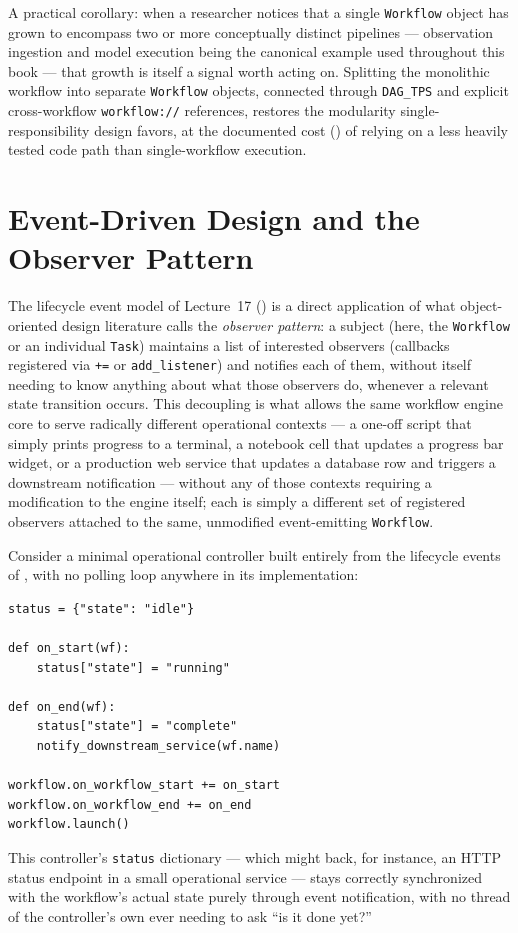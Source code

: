 \begin{practicebox}
A practical corollary: when a researcher notices that a single
\texttt{Workflow} object has grown to encompass two or more conceptually
distinct pipelines --- observation ingestion and model execution being the
canonical example used throughout this book --- that growth is itself a
signal worth acting on. Splitting the monolithic workflow into separate
\texttt{Workflow} objects, connected through \texttt{DAG\_TPS} and explicit
cross-workflow \texttt{workflow://} references, restores the modularity
single-responsibility design favors, at the documented cost
() of relying on a less heavily tested code path than
single-workflow execution.
\end{practicebox}

\section{Event-Driven Design and the Observer Pattern}

The lifecycle event model of Lecture~17 () is a
direct application of what object-oriented design literature calls the
\emph{observer pattern}: a subject (here, the \texttt{Workflow} or an
individual \texttt{Task}) maintains a list of interested observers
(callbacks registered via \texttt{+=} or \texttt{add\_listener}) and
notifies each of them, without itself needing to know anything about what
those observers do, whenever a relevant state transition occurs. This
decoupling is what allows the same workflow engine core to serve radically
different operational contexts --- a one-off script that simply prints
progress to a terminal, a notebook cell that updates a progress bar widget,
or a production web service that updates a database row and triggers a
downstream notification --- without any of those contexts requiring a
modification to the engine itself; each is simply a different set of
registered observers attached to the same, unmodified event-emitting
\texttt{Workflow}.

\begin{example}
Consider a minimal operational controller built entirely from the lifecycle
events of , with no polling loop anywhere in its
implementation:
\begin{lstlisting}
status = {"state": "idle"}

def on_start(wf):
    status["state"] = "running"

def on_end(wf):
    status["state"] = "complete"
    notify_downstream_service(wf.name)

workflow.on_workflow_start += on_start
workflow.on_workflow_end += on_end
workflow.launch()
\end{lstlisting}
This controller's \texttt{status} dictionary --- which might back, for
instance, an HTTP status endpoint in a small operational service --- stays
correctly synchronized with the workflow's actual state purely through
event notification, with no thread of the controller's own ever needing to
ask ``is it done yet?''
\end{example}

